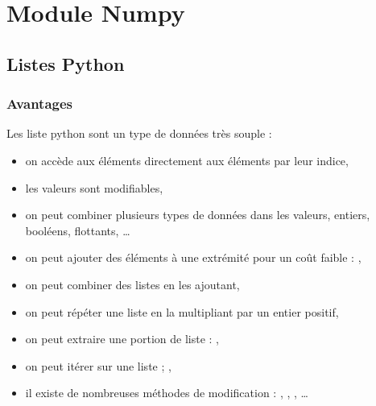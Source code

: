 \chapter{Module Numpy}
\thispagestyle{empty}
\section{Listes Python}
\subsection{Avantages}
Les liste python sont un type de données très souple :
\begin{itemize}
\item on accède aux éléments directement aux éléments par leur indice,
\item les valeurs sont modifiables,
\item on peut combiner plusieurs types de données dans les valeurs, entiers, booléens, flottants, \dots
\item on peut ajouter des éléments à une extrémité pour un coût faible : ,
\item on peut combiner des listes en les ajoutant,
\item on peut répéter une liste en la multipliant par un entier positif, 
\item on peut extraire une portion de liste : ,
\item on peut itérer sur une liste ; , 
\item il existe de nombreuses méthodes de modification : , , , \dots
\end{itemize}

